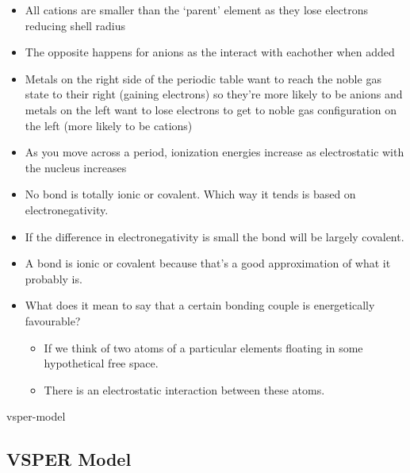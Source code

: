 \documentclass[12pt]{article}
\begin{document}
\begin{itemize}
\item
  All cations are smaller than the `parent' element as they lose
  electrons reducing shell radius
\item
  The opposite happens for anions as the interact with eachother when
  added
\item
  Metals on the right side of the periodic table want to reach the noble
  gas state to their right (gaining electrons) so they're more likely to
  be anions and metals on the left want to lose electrons to get to
  noble gas configuration on the left (more likely to be cations)
\item
  As you move across a period, ionization energies increase as
  electrostatic with the nucleus increases
\item
  No bond is totally ionic or covalent. Which way it tends is based on
  electronegativity.
\item
  If the difference in electronegativity is small the bond will be
  largely covalent.
\item
  A bond is ionic or covalent because that's a good approximation of
  what it probably is.
\item
  What does it mean to say that a certain bonding couple is
  energetically favourable?

  \begin{itemize}
  \item
    If we think of two atoms of a particular elements floating in some
    hypothetical free space.
  \item
    There is an electrostatic interaction between these atoms.
  \end{itemize}
\end{itemize}

 {vsper-model}{%
\subsection{VSPER Model}\label{vsper-model}}
\end{document}
